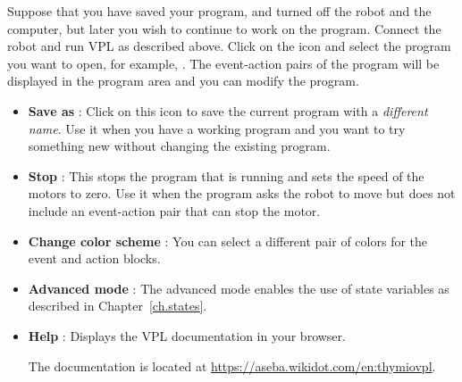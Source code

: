 Suppose that you have saved your program, and turned off the robot and
the computer, but later you wish to continue to work on the program.
Connect the robot and run VPL as described above. Click on the icon
 and select the program you want to open, for example,
. The event-action pairs of the program will be displayed in
the program area and you can modify the program.


\begin{itemize}

\item \textbf{Save as} : Click on this icon to save the
current program with a \emph{different name}. Use it when you have a
working program and you want to try something new without changing the
existing program.

\item \textbf{Stop} : This stops the program that is running
and sets the speed of the motors to zero. Use it when the program asks
the robot to move but does not include an event-action pair that can
stop the motor.

\item \textbf{Change color scheme} : You can select a
different pair of colors for the event and action blocks.

\item \textbf{Advanced mode} : The advanced mode enables
the use of state variables as described in Chapter~\ref{ch.states}.

\item \textbf{Help} : Displays the VPL documentation in
your browser.

The documentation is located at
\url{https://aseba.wikidot.com/en:thymiovpl}.

\end{itemize}

